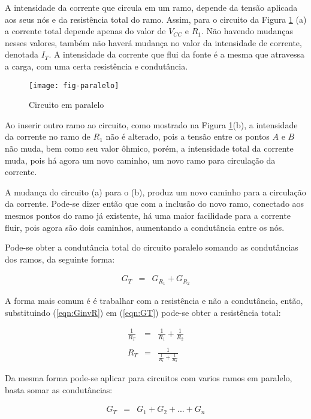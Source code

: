 A intensidade da corrente que circula em um ramo, depende da tensão aplicada aos seus nós e da resistência total do ramo. Assim, para o circuito da Figura \ref{fig:paralelo} (a) a corrente total depende apenas do valor de $V_{CC}$ e $R_1$. Não havendo mudanças nesses valores, também não haverá mudança no valor da intensidade de corrente, denotada $I_T$. A intensidade da corrente que flui da fonte é a mesma que atravessa a carga, com uma certa resistência e condutância.

\begin{figure}[!h]
	\centering
	\caption{Circuito em paralelo}
	\texttt{[image: fig-paralelo]}
	\label{fig:paralelo}
\end{figure}

Ao inserir outro ramo ao circuito, como mostrado na Figura \ref{fig:paralelo}(b), a intensidade da corrente no ramo de $R_1$ não é alterado, pois a tensão entre os pontos $A$ e $B$ não muda, bem como seu valor ôhmico, porém, a intensidade total da corrente muda, pois há agora um novo caminho, um novo ramo para circulação da corrente.

A mudança do circuito (a) para o (b), produz um novo caminho para a circulação da corrente. Pode-se dizer então que com a inclusão do novo ramo, conectado aos mesmos pontos do ramo já existente, há uma maior facilidade para a corrente fluir, pois agora são dois caminhos, aumentando a condutância entre os nós.

Pode-se obter a condutância total do circuito paralelo somando as condutâncias dos ramos, da seguinte forma:

\begin{eqnarray}
  G_T & = & G_{R_1} + G_{R_2}
\label{eqn:GT}
\end{eqnarray}

A forma mais comum é é trabalhar com a resistência e não a condutância, então,
substituindo (\ref{eqn:GinvR}) em (\ref{eqn:GT}) pode-se obter a resistência total:

\begin{eqnarray}
  \frac{1}{R_T}	& = & \frac{1}{R_1} + \frac{1}{R_2} \nonumber\\
	\nonumber\\
	R_T & = & \frac{1}{\frac{1}{R_1} + \frac{1}{R_2} }
	\label{eq:paralelo}
\end{eqnarray}


Da mesma forma pode-se aplicar para circuitos com varios ramos em paralelo, basta somar as condutâncias:

\begin{eqnarray}
	G_T & = & G_1 + G_2 + ... + G_n
\end{eqnarray}

